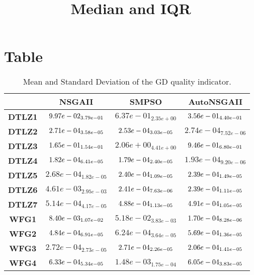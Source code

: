 \documentclass{article}
\title{Median and IQR}
\author{}
\begin{document}
\maketitle
\section{Table}
\begin{table}[!htp]
  \caption{Mean and Standard Deviation of the GD quality indicator.}
  \label{table:GD}
  \centering
  \begin{scriptsize}
  \begin{tabular}{c|ccc}
      & \textbf{NSGAII} & \textbf{SMPSO} & \textbf{AutoNSGAII} \\\hline
      \textbf{DTLZ1} & $\cellcolor{gray95} 9.97e-02_{3.79e-01} $ & $ 6.37e-01_{2.35e+00} $ & $ \cellcolor{gray25} 3.56e-01_{4.40e-01}$ \\
      \textbf{DTLZ2} & $\cellcolor{gray25} 2.71e-04_{3.58e-05} $ & $ \cellcolor{gray95} 2.53e-04_{3.03e-05} $ & $ 2.74e-04_{7.52e-06}$ \\
      \textbf{DTLZ3} & $\cellcolor{gray95} 1.65e-01_{1.54e-01} $ & $ 2.06e+00_{4.41e+00} $ & $ \cellcolor{gray25} 9.46e-01_{6.80e-01}$ \\
      \textbf{DTLZ4} & $\cellcolor{gray25} 1.82e-04_{6.41e-05} $ & $ \cellcolor{gray95} 1.79e-04_{2.40e-05} $ & $ 1.93e-04_{9.20e-06}$ \\
      \textbf{DTLZ5} & $2.68e-04_{1.82e-05} $ & $ \cellcolor{gray25} 2.40e-04_{1.09e-05} $ & $ \cellcolor{gray95} 2.39e-04_{1.49e-05}$ \\
      \textbf{DTLZ6} & $4.61e-03_{2.95e-03} $ & $ \cellcolor{gray25} 2.41e-04_{7.63e-06} $ & $ \cellcolor{gray95} 2.39e-04_{1.11e-05}$ \\
      \textbf{DTLZ7} & $5.14e-04_{4.17e-05} $ & $ \cellcolor{gray95} 4.88e-04_{1.13e-05} $ & $ \cellcolor{gray25} 4.91e-04_{1.05e-05}$ \\
      \textbf{WFG1} & $\cellcolor{gray25} 8.40e-03_{1.07e-02} $ & $ 5.18e-02_{3.83e-03} $ & $ \cellcolor{gray95} 1.70e-04_{8.28e-06}$ \\
      \textbf{WFG2} & $\cellcolor{gray95} 4.84e-04_{6.91e-05} $ & $ 6.24e-04_{3.64e-05} $ & $ \cellcolor{gray25} 5.69e-04_{1.36e-05}$ \\
      \textbf{WFG3} & $2.72e-04_{2.73e-05} $ & $ \cellcolor{gray25} 2.71e-04_{2.26e-05} $ & $ \cellcolor{gray95} 2.06e-04_{1.41e-05}$ \\
      \textbf{WFG4} & $\cellcolor{gray25} 6.33e-04_{5.34e-05} $ & $ 1.48e-03_{1.75e-04} $ & $ \cellcolor{gray95} 6.05e-04_{3.83e-05}$ \\

\end{tabular}
\end{scriptsize}
\end{table}
\end{document}
